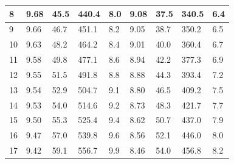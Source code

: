 \documentclass[12pt, a4paper]{article}
\begin{document}
\begin{table}[H]
\begin{center}
\begin{tabular}{|l|llll|llll|}
	8  & \multicolumn{1}{l|}{9.68}   & \multicolumn{1}{l|}{45.5}    & \multicolumn{1}{l|}{440.4}     & 8.0       & \multicolumn{1}{l|}{9.08}   & \multicolumn{1}{l|}{37.5}    & \multicolumn{1}{l|}{340.5}     & 6.4       \\ \hline
	9  & \multicolumn{1}{l|}{9.66}   & \multicolumn{1}{l|}{46.7}    & \multicolumn{1}{l|}{451.1}     & 8.2       & \multicolumn{1}{l|}{9.05}   & \multicolumn{1}{l|}{38.7}    & \multicolumn{1}{l|}{350.2}     & 6.5       \\ \hline
	10 & \multicolumn{1}{l|}{9.63}   & \multicolumn{1}{l|}{48.2}    & \multicolumn{1}{l|}{464.2}     & 8.4       & \multicolumn{1}{l|}{9.01}   & \multicolumn{1}{l|}{40.0}    & \multicolumn{1}{l|}{360.4}     & 6.7       \\ \hline
	11 & \multicolumn{1}{l|}{9.58}   & \multicolumn{1}{l|}{49.8}    & \multicolumn{1}{l|}{477.1}     & 8.6       & \multicolumn{1}{l|}{8.94}   & \multicolumn{1}{l|}{42.2}    & \multicolumn{1}{l|}{377.3}     & 6.9       \\ \hline
	12 & \multicolumn{1}{l|}{9.55}   & \multicolumn{1}{l|}{51.5}    & \multicolumn{1}{l|}{491.8}     & 8.8       & \multicolumn{1}{l|}{8.88}   & \multicolumn{1}{l|}{44.3}    & \multicolumn{1}{l|}{393.4}     & 7.2       \\ \hline
	13 & \multicolumn{1}{l|}{9.54}   & \multicolumn{1}{l|}{52.9}    & \multicolumn{1}{l|}{504.7}     & 9.1       & \multicolumn{1}{l|}{8.80}   & \multicolumn{1}{l|}{46.5}    & \multicolumn{1}{l|}{409.2}     & 7.5       \\ \hline
	14 & \multicolumn{1}{l|}{9.53}   & \multicolumn{1}{l|}{54.0}    & \multicolumn{1}{l|}{514.6}     & 9.2       & \multicolumn{1}{l|}{8.73}   & \multicolumn{1}{l|}{48.3}    & \multicolumn{1}{l|}{421.7}     & 7.7       \\ \hline
	15 & \multicolumn{1}{l|}{9.50}   & \multicolumn{1}{l|}{55.3}    & \multicolumn{1}{l|}{525.4}     & 9.4       & \multicolumn{1}{l|}{8.62}   & \multicolumn{1}{l|}{50.7}    & \multicolumn{1}{l|}{437.0}     & 7.9       \\ \hline
	16 & \multicolumn{1}{l|}{9.47}   & \multicolumn{1}{l|}{57.0}    & \multicolumn{1}{l|}{539.8}     & 9.6       & \multicolumn{1}{l|}{8.56}   & \multicolumn{1}{l|}{52.1}    & \multicolumn{1}{l|}{446.0}     & 8.0       \\ \hline
	17 & \multicolumn{1}{l|}{9.42}   & \multicolumn{1}{l|}{59.1}    & \multicolumn{1}{l|}{556.7}     & 9.9       & \multicolumn{1}{l|}{8.46}   & \multicolumn{1}{l|}{54.0}    & \multicolumn{1}{l|}{456.8}     & 8.2       \\ \hline

\end{tabular}
\end{center}
\end{table}
\end{document}

